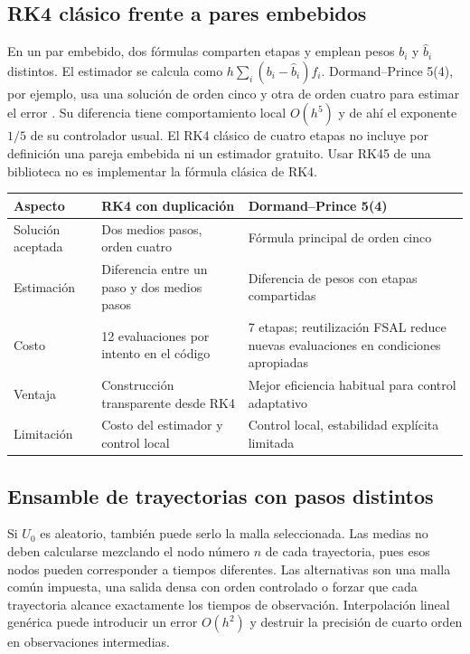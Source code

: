 \documentclass[11pt,a4paper]{article}
\theoremstyle{definition}\newtheorem{definition}[theorem]{Definición}
\theoremstyle{remark}\newtheorem{remark}[theorem]{Observación}
\begin{document}
\subsection{RK4 clásico frente a pares embebidos}
En un par embebido, dos fórmulas comparten etapas y emplean pesos $b_i$ y
$\widehat b_i$ distintos. El estimador se calcula como
$h\sum_i(b_i-\widehat b_i)f_i$. Dormand--Prince 5(4), por ejemplo, usa una
solución de orden cinco y otra de orden cuatro para estimar el error
\cite{dormand}. Su diferencia tiene comportamiento local $O(h^5)$ y de ahí
el exponente $1/5$ de su controlador usual. El RK4 clásico de cuatro etapas
no incluye por definición una pareja embebida ni un estimador gratuito.
Usar RK45 de una biblioteca no es implementar la fórmula clásica de RK4.

\begin{center}\small
\begin{tabularx}{\linewidth}{@{}p{3.5cm}XX@{}}\toprule
Aspecto & RK4 con duplicación & Dormand--Prince 5(4)\\\midrule
Solución aceptada & Dos medios pasos, orden cuatro & Fórmula principal de orden cinco\\
Estimación & Diferencia entre un paso y dos medios pasos & Diferencia de pesos con etapas compartidas\\
Costo & 12 evaluaciones por intento en el código & 7 etapas; reutilización FSAL reduce nuevas evaluaciones en condiciones apropiadas\\
Ventaja & Construcción transparente desde RK4 & Mejor eficiencia habitual para control adaptativo\\
Limitación & Costo del estimador y control local & Control local, estabilidad explícita limitada\\\bottomrule
\end{tabularx}\end{center}

\subsection{Ensamble de trayectorias con pasos distintos}
Si $U_0$ es aleatorio, también puede serlo la malla seleccionada. Las medias
no deben calcularse mezclando el nodo número $n$ de cada trayectoria, pues
esos nodos pueden corresponder a tiempos diferentes. Las alternativas son
una malla común impuesta, una salida densa con orden controlado o forzar
que cada trayectoria alcance exactamente los tiempos de observación.
Interpolación lineal genérica puede introducir un error $O(h^2)$ y destruir
la precisión de cuarto orden en observaciones intermedias.
\end{document}
